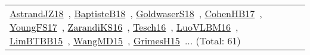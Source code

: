 {\begin{longtable}{lp{3cm}>{\raggedright\arraybackslash}p{6cm}>{\raggedright\arraybackslash}p{6cm}>{\raggedright\arraybackslash}p{8cm}}
\href{works/AstrandJZ18.pdf}{AstrandJZ18}~\cite{AstrandJZ18}, \href{works/BaptisteB18.pdf}{BaptisteB18}~\cite{BaptisteB18}, \href{works/GoldwaserS18.pdf}{GoldwaserS18}~\cite{GoldwaserS18}, \href{works/CohenHB17.pdf}{CohenHB17}~\cite{CohenHB17}, \href{works/YoungFS17.pdf}{YoungFS17}~\cite{YoungFS17}, \href{works/ZarandiKS16.pdf}{ZarandiKS16}~\cite{ZarandiKS16}, \href{works/Tesch16.pdf}{Tesch16}~\cite{Tesch16}, \href{works/LuoVLBM16.pdf}{LuoVLBM16}~\cite{LuoVLBM16}, \href{works/LimBTBB15.pdf}{LimBTBB15}~\cite{LimBTBB15}, \href{works/WangMD15.pdf}{WangMD15}~\cite{WangMD15}, \href{works/GrimesH15.pdf}{GrimesH15}~\cite{GrimesH15}... (Total: 61)\\
\end{longtable}
}

